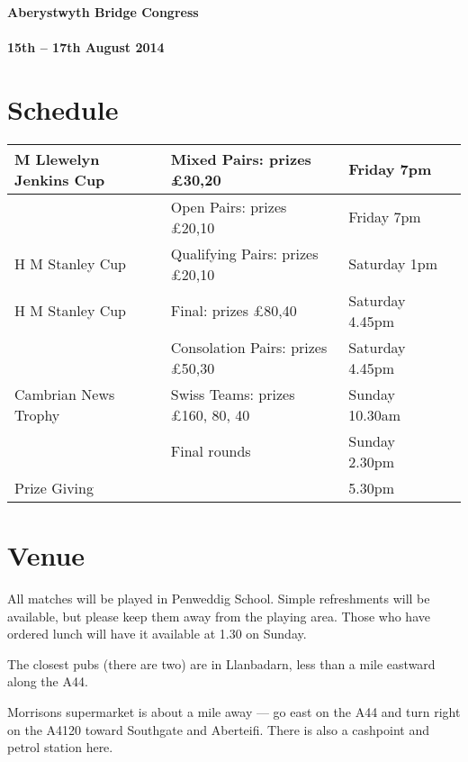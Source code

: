 \documentclass[12pt]{article}
\begin{document}
{\bf {\Large Aberystwyth Bridge Congress}}\\
\ \\
{\bf {\large 15th -- 17th August 2014}}

\section{Schedule}
\begin{center}
\begin{tabular}{|| l | l | l | l ||}
        \hline
        \hline
        M Llewelyn Jenkins Cup &
        Mixed Pairs:
        prizes \pounds 30,20 &
        Friday 7pm \\
        \hline
        &
        Open Pairs:
        prizes \pounds 20,10 &
        Friday 7pm \\
        \hline
        \hline
        H M Stanley Cup &
        Qualifying Pairs:
        prizes \pounds 20,10 &
        Saturday 1pm \\
        \hline
        H M Stanley Cup &
        Final:
        prizes \pounds 80,40 &
        Saturday 4.45pm \\
        \hline
        &
        Consolation Pairs:
        prizes \pounds 50,30 &
        Saturday 4.45pm \\
        \hline
        \hline
        Cambrian News Trophy &
        Swiss Teams:
        prizes \pounds 160, 80, 40 &
        Sunday 10.30am \\
        \hline
        &
        Final rounds &
        Sunday 2.30pm \\
        \hline
        Prize Giving & & 5.30pm\\
        \hline
        \hline
\end{tabular}
\end{center}

\section{Venue}

All matches will be played in Penweddig School.
Simple refreshments will be available, but please keep them away from
the playing area.
Those who have ordered lunch will have it available at 1.30 on Sunday.

The closest pubs (there are two) are in Llanbadarn, less than a mile
eastward along the A44.

Morrisons supermarket is about a mile away --- go east on the A44 and
turn right on the A4120 toward Southgate and Aberteifi.  There is also
a cashpoint and petrol station here.
\end{document}
